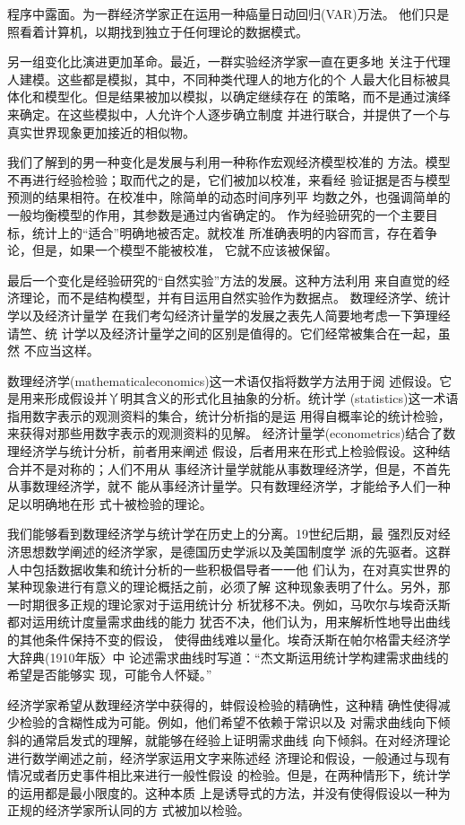 程序中露面。为一群经济学家正在运用一种癌量日动回归(VAR)万法。
他们只是照看着计算机，以期找到独立于任何理论的数据模式。

另一组变化比演进更加革命。最近，一群实验经济学家一直在更多地
关注于代理人建模。这些都是模拟，其中，不同种类代理人的地方化的个
人最大化目标被具体化和模型化。但是结果被加以模拟，以确定继续存在
的策略，而不是通过演绎来确定。在这些模拟中，人允许个人逐步确立制度
并进行联合，并提供了一个与真实世界现象更加接近的相似物。

我们了解到的男一种变化是发展与利用一种称作宏观经济模型校准的
方法。模型不再进行经验检验；取而代之的是，它们被加以校准，来看经
验证据是否与模型预测的结果相符。在校准中，除简单的动态时间序列平
均数之外，也强调简单的一般均衡模型的作用，其参数是通过内省确定的。
作为经验研究的一个主要目标，统计上的“适合”明确地被否定。就校准
所准确表明的内容而言，存在着争论，但是，如果一个模型不能被校准，
它就不应该被保留。

最后一个变化是经验研究的“自然实验”方法的发展。这种方法利用
来自直觉的经济理论，而不是结构模型，并有目运用自然实验作为数据点。
数理经济学、统计学以及经济计量学
在我们考勾经济计量学的发展之表先人简要地考虑一下笋理经请竺、统
计学以及经济计量学之间的区别是值得的。它们经常被集合在一起，虽然
不应当这样。

数理经济学(mathematicaleconomics)这一术语仅指将数学方法用于阅
述假设。它是用来形成假设并丫明其含义的形式化且抽象的分析。统计学
(statistics)这一术语指用数字表示的观测资料的集合，统计分析指的是运
用得自概率论的统计检验，来获得对那些用数字表示的观测资料的见解。
经济计量学(econometrics)结合了数理经济学与统计分析，前者用来阐述
假设，后者用来在形式上检验假设。这种结合并不是对称的；人们不用从
事经济计量学就能从事数理经济学，但是，不首先从事数理经济学，就不
能从事经济计量学。只有数理经济学，才能给予人们一种足以明确地在形
式十被检验的理论。

我们能够看到数理经济学与统计学在历史上的分离。19世纪后期，最
强烈反对经济思想数学阐述的经济学家，是德国历史学派以及美国制度学
派的先驱者。这群人中包括数据收集和统计分析的一些积极倡导者一一他
们认为，在对真实世界的某种现象进行有意义的理论概括之前，必须了解
这种现象表明了什么。另外，那一时期很多正规的理论家对于运用统计分
析犹移不决。例如，马吹尔与埃奇沃斯都对运用统计度量需求曲线的能力
犹否不决，他们认为，用来解析性地导出曲线的其他条件保持不变的假设，
使得曲线难以量化。埃奇沃斯在帕尔格雷夫经济学大辞典(1910年版〉中
论述需求曲线时写道：“杰文斯运用统计学构建需求曲线的希望是否能够实
现，可能令人怀疑。”

经济学家希望从数理经济学中获得的，蚌假设检验的精确性，这种精
确性使得减少检验的含糊性成为可能。例如，他们希望不依赖于常识以及
对需求曲线向下倾斜的通常启发式的理解，就能够在经验上证明需求曲线
向下倾斜。在对经济理论进行数学阐述之前，经济学家运用文字来陈述经
济理论和假设，一般通过与现有情况或者历史事件相比来进行一般性假设
的检验。但是，在两种情形下，统计学的运用都是最小限度的。这种本质
上是诱导式的方法，并没有使得假设以一种为正规的经济学家所认同的方
式被加以检验。

